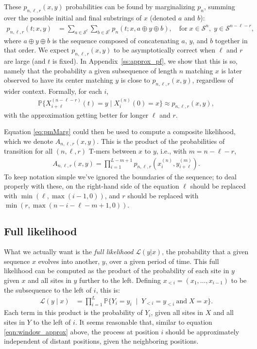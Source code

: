 \documentclass{article}
\renewcommand{\P}{\mathbb{P}}
\newcommand{\calS}{\mathcal{S}}  %
\newcommand{\join}{\oplus}  %
\newcommand{\given}{\;\mid\;}
\newcommand{\like}{\mathcal L}
\theoremstyle{plain}
\theoremstyle{definition}
\begin{document}
These $p_{n,\ell,r}(x,y)$ probabilities can be found by marginalizing $p_n$,
summing over the possible initial and final substrings of $x$
(denoted $a$ and $b$):
\begin{align}
    p_{n,\ell,r}(t;x,y)
    &=
    \sum_{a \in \calS^\ell} \sum_{b \in \calS^r} p_n(t;x,a \join y \join b) ,
    \quad
    \text{for}\; x \in \calS^n, \; y \in \calS^{n-\ell-r} ,
    \label{eq:pmMarg}
\end{align}
where $a \join y \join b$ is the sequence composed of concatenating $a$, $y$, and $b$ together in that order.
We expect $p_{n,\ell,r}(x,y)$ to be asymptotically correct when $\ell$ and $r$ are large (and $t$ is fixed).
In Appendix~\ref{ss:approx_pf}, we show that this is so, namely that
the probability a given subsequence of length $n$ matching $x$
is later observed to have its center matching $y$
is close to $p_{n,\ell,r}(x,y)$, regardless of wider context.
Formally, for each $i$,
\begin{align} \label{eqn:window_approx}
    \P\{ X_{i+\ell}^{(n-\ell-r)}(t) = y \mid X_i^{(n)}(0) = x \}
    \approx
    p_{n,\ell,r}(x,y)
    ,
\end{align}
with the approximation getting better for longer $\ell$ and $r$.

Equation \eqref{eq:pmMarg} could then be used to compute a composite likelihood,
which we denote $A_{n, \ell, r}(x,y)$.
This is the product of the probabilities
of transition for all $(n, \ell, r)$ T-mers between $x$ to $y$, i.e.,
with $m = n - \ell - r$,
\begin{align}\label{eqn:composite_like}
    A_{n, \ell, r}(x,y)
        =
        \prod_{i=1}^{L-m+1} p_{n, \ell, r}\left(x_i^{(n)}, y_{i+\ell}^{(m)}\right).
\end{align}
To keep notation simple we've ignored the boundaries of the sequence;
to deal properly with these,
on the right-hand side of the equation $\ell$ should be replaced with $\min(\ell, \max(i-1, 0))$,
and $r$ should be replaced with $\min(r, \max(n-i-\ell-m+1, 0))$.


\subsection{Full likelihood}

What we actually want is the \emph{full likelihood} $\like(y|x)$,
the probability that a given sequence $x$ evolves into another, $y$, over a given period of time.
This full likelihood can be computed as the product of the probability of each site in $y$
given $x$ and all sites in $y$ further to the left.
Defining $x_{<i}=(x_1, \ldots, x_{i-1})$ to be the subsequence to the left of $i$, this is:
\begin{align*}
    \like(y \mid x) &= \prod_{i=1}^L \P\{ Y_i = y_i \given Y_{<i} = y_{<i} \ \text{and}\; X=x \} .
\end{align*}
Each term in this product is the probability of $Y_i$, given all sites in $X$
and all sites in $Y$ to the left of $i$.
It seems reasonable that, similar to equation \eqref{eqn:window_approx} above,
the process at position $i$ should be approximately independent
of distant positions, given the neighboring positions.
\end{document}
